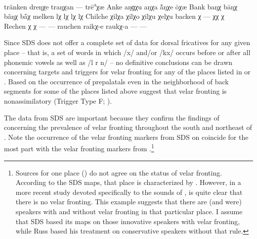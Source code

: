 {\begin{xlist}
\ex\label{ex:15:31c} tränken \tab dreŋχ{\textquotedbl}e \tab traŋχ{\textquotedbl}an \tab ---  \tab  trē\textsuperscript{ə}χ{\textquotesingle}æ
\ex\label{ex:15:31d} Anke \tab aŋɡχ{\textquotedbl}u \tab aŋχ{\textquotedbl}a \tab \~{å}ŋχ{\textquotedbl}e  \tab  ōχ{\textquotesingle}æ
\ex\label{ex:15:31e} Bank \tab baŋχ{\textquotedbl} \tab bāŋχ{\textquotesingle} \tab bãŋχ{\textquotedbl}  \tab  b\={å}χ{\textquotesingle}
\ex\label{ex:15:31f} melken \tab lχ{\textquotedbl}  \tab  lχ{\textquotedbl}  \tab  lχ{\textquotesingle}  \tab  lχ{\textquotesingle}
\ex\label{ex:15:31g} Chilche \tab χ{\textquotedbl}il{\textquotesingle}χ{\textquotedbl}a \tab χ{\textquotedbl}il{\textquotedbl}χ{\textquotedbl}o \tab χ{\textquotesingle}ilχ{\textquotedbl}u  \tab  χ{\textquotesingle}elχ{\textquotesingle}u
\ex\label{ex:15:31h} backen \tab χ{\textquotesingle}  \tab  --- \tab χ{\textquotesingle}χ{\textquotesingle}  \tab  χ{\textquotesingle}\\
    Rechen \tab χ{\textquotedbl}  \tab  χ{\textquotedbl}  \tab  ---  \tab  ---
\ex\label{ex:15:31i} rauchen \tab raikχ{\textquotesingle}-e \tab raukχ{\textquotedbl}-a \tab ---  \tab  ---
\end{xlist}
\z 

Since SDS does not offer a complete set of data for dorsal fricatives for any given place -- that is, a set of words in which /x/ and/or /kx/ occurs before or after all phonemic vowels as well as /l r n/ -- no definitive conclusions can be drawn concerning targets and triggers for velar fronting for any of the places listed in  or . Based on the occurrence of prepalatals even in the neighborhood of back segments for some of the places listed above suggest that velar fronting is nonassimilatory (Trigger Type F; ).

The data from SDS are important because they confirm the findings of \citet{Rübel1950} concerning the prevalence of velar fronting throughout the south and northeast of . Note the occurrence of the velar fronting markers from SDS on  coincide for the most part with the velar fronting markers from \citet{Rübel1950}.\footnote{Sources for one place () do not agree on the status of velar fronting.  According to the SDS  maps, that place is characterized by . However, in a more recent study devoted specifically to the sounds of , \citet[77]{Russ2002} is quite clear that there is no velar fronting. This example suggests that there are (and were) speakers with and without velar fronting in that particular place. I assume that SDS based its maps on those innovative speakers with velar fronting, while Russ based his treatment on conservative speakers without that rule.}

}
